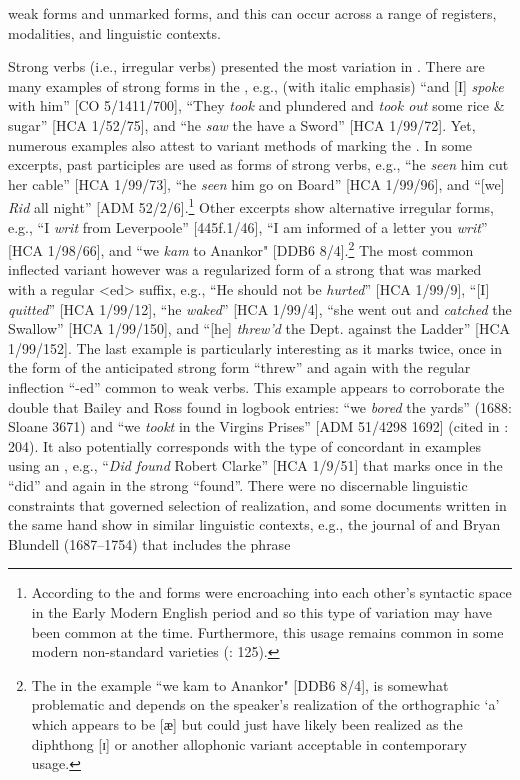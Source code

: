 weak  forms and unmarked  forms, and this can occur across a range of registers, modalities, and linguistic contexts. 

Strong verbs (i.e., irregular verbs) presented the most variation in . There are many examples of strong  forms in the , e.g., (with italic emphasis) “and [I] \textit{spoke} with him” [CO 5/1411/700], “They \textit{took} and plundered and \textit{took out} some rice \& sugar” [HCA 1/52/75], and “he \textit{saw} the  have a Sword” [HCA 1/99/72]. Yet, numerous examples also attest to variant methods of marking the . In some excerpts, past participles are used as  forms of strong verbs, e.g., “he \textit{seen} him cut her cable” [HCA 1/99/73], “he \textit{seen} him go on Board” [HCA 1/99/96], and “[we] \textit{Rid} all night” [ADM 52/2/6].\footnote{According to \citet[95]{Blake2002} the  and  forms were encroaching into each other’s syntactic space in the Early Modern English period and so this type of variation may have been common at the time. Furthermore, this usage remains common in some modern non-standard varieties (\citealt{Cheshire1994}: 125).} Other excerpts show alternative irregular  forms, e.g., “I \textit{writ} from Leverpoole” [445f.1/46], “I am informed of a letter you \textit{writ}” [HCA 1/98/66], and “we \textit{kam} to Anankor" [DDB6 8/4].\footnote{The  in the example “we kam to Anankor" [DDB6 8/4], is somewhat problematic and depends on the speaker’s realization of the orthographic ‘a’ which appears to be [{ӕ] but could just have likely been realized as the diphthong [{ɪ}] or another allophonic variant acceptable in contemporary usage.} } The most common inflected variant however was a regularized form of a strong  that was marked with a regular <ed> suffix, e.g., “He should not be \textit{hurted}” [HCA 1/99/9], “[I] \textit{quitted}” [HCA 1/99/12], “he \textit{waked}” [HCA 1/99/4], “she went out and \textit{catched} the Swallow” [HCA 1/99/150], and “[he] \textit{threw’d} the Dept. against the Ladder” [HCA 1/99/152]. The last example is particularly interesting as it marks  twice, once in the form of the anticipated strong  form “threw” and again with the regular inflection “-ed” common to weak verbs. This example appears to corroborate the double  that Bailey and Ross found in logbook entries: “we \textit{bored} the yards” (1688: Sloane 3671) and “we \textit{tookt} in the Virgins Prises” [ADM 51/4298 1692] (cited in \citealt{BaileyRoss1988}: 204). It also potentially corresponds with the type of concordant  in examples using an , e.g., “\textit{Did found} Robert Clarke” [HCA 1/9/51] that marks  once in the  “did” and again in the strong  “found”. There were no discernable linguistic constraints that governed selection of  realization, and some documents written in the same hand show  in similar linguistic contexts, e.g., the journal of  and  Bryan Blundell (1687–1754) that includes the phrase 